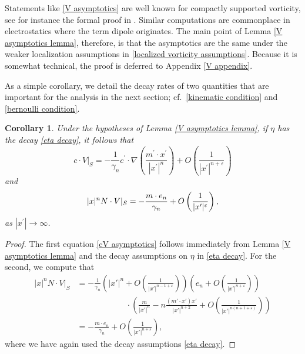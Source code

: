 \documentclass[11pt,reqno]{amsart}
\newcommand{\abs}[2][]{#1\lvert #2 #1\rvert}
\theoremstyle{plain}
\newtheorem{corollary}[theorem]{Corollary}
\theoremstyle{remark}
\numberwithin{equation}{section}
\begin{document}
Statements like \eqref{V asymptotics} are well known for compactly supported vorticity, see for instance the formal proof in 
\cite[Chapter 3.2]{saffman1992book}.  Similar computations are commonplace in electrostatics where the term dipole originates.  The main point of Lemma \ref{V asymptotics lemma}, therefore, is that the asymptotics are the same under the weaker localization assumptions in \eqref{localized vorticity assumptions}.  Because it is somewhat technical, the proof is deferred to Appendix \ref{V appendix}. 

 As a simple corollary, we detail the decay rates of two quantities that are important for the analysis in the next section; cf.\ \eqref{kinematic condition} and \eqref{bernoulli condition}. 


 \begin{corollary} \label{boundary term asymptotics corollary} 
 Under the hypotheses of Lemma \ref{V asymptotics lemma}, 
 if $\eta$ has the decay \eqref{eta decay}, it follows that 
\begin{equation}
  c \cdot V|_S = -\frac{1}{\gamma_n} c^\prime \cdot \nabla \left( \frac{m^\prime \cdot x^\prime}{|x^\prime|^n} \right) + O \left(\frac{1}{|x^\prime|^{n+\varepsilon}} \right) \label{cV asymptotics} 
\end{equation}
and 
\begin{equation}
  \label{NV asymptotics}
  |x|^n N \cdot V|_S = -{m\cdot e_n\over \gamma_n } + O\left( {1\over |x'|^{\varepsilon}} \right),  
\end{equation}
as $|x^\prime| \to \infty$.  
\end{corollary}
\begin{proof}  
The first equation \eqref{cV asymptotics} follows immediately from Lemma \ref{V asymptotics lemma} and the decay assumptions on $\eta$ in \eqref{eta decay}.  For the second, we compute that
\begin{align*}
  |x|^n N \cdot V|_S 
  &= 
  -\frac 1{\gamma_n} 
  \left( \abs{x'}^n + O\!\left( \frac 1{\abs{x'}^{n-1+\varepsilon}} \right) \right)
  \left( e_n + O\!\left(\frac 1{\abs{x'}^{n+\varepsilon}} \right) \right)\\
  &\qquad\qquad\qquad\cdot
  \left( \frac m{\abs{x'}^n} - n \frac{(m'\cdot x')x'}{\abs{x'}^{n+2}}
  + O\!\left( \frac 1{\abs{x'}^{n(n+1+\varepsilon)}} \right)\right)\\
  &= - \frac{m \cdot e_n}{\gamma_n} + O\!\left( \frac 1{\abs{x'}^{n+\varepsilon}} \right),
\end{align*}
where we have again used the decay assumptions \eqref{eta decay}. 
\end{proof}
\end{document}
